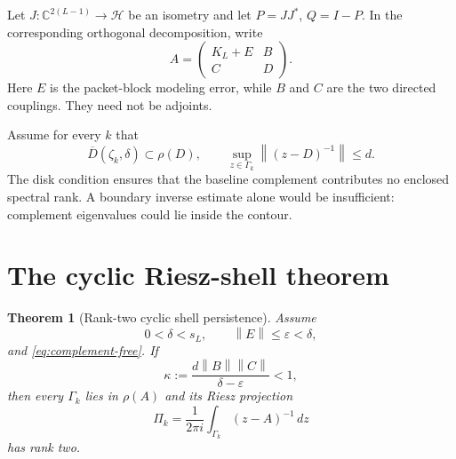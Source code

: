 \documentclass[12pt]{article}
\newtheorem{theorem}{Theorem}[section]
\theoremstyle{remark}
\newcommand{\cH}{\mathcal H}
\newcommand{\norm}[1]{\left\lVert#1\right\rVert}
\begin{document}
Let $J:\mathbb C^{2(L-1)}\to\cH$ be an isometry and let $P=JJ^*$,
$Q=I-P$.  In the corresponding orthogonal decomposition, write
\begin{equation}\label{eq:block}
 A=\begin{pmatrix}
 K_L+E&B\\
 C&D
 \end{pmatrix}.
\end{equation}
Here $E$ is the packet-block modeling error, while $B$ and $C$ are the two
directed couplings.  They need not be adjoints.

Assume for every $k$ that
\begin{equation}\label{eq:complement-free}
 \overline D(\zeta_k,\delta)\subset\rho(D),
 \qquad
 \sup_{z\in\Gamma_k}\norm{(z-D)^{-1}}\le d.
\end{equation}
The disk condition ensures that the baseline complement contributes no
enclosed spectral rank.  A boundary inverse estimate alone would be
insufficient: complement eigenvalues could lie inside the contour.

\section{The cyclic Riesz-shell theorem}

\begin{theorem}[Rank-two cyclic shell persistence]\label{thm:riesz}
Assume
\begin{equation}\label{eq:geometry-assumptions}
 0<\delta<s_L,
 \qquad
 \norm E\le\varepsilon<\delta,
\end{equation}
and \eqref{eq:complement-free}.  If
\begin{equation}\label{eq:schur}
 \kappa:=\frac{d\norm B\norm C}{\delta-\varepsilon}<1,
\end{equation}
then every $\Gamma_k$ lies in $\rho(A)$ and its Riesz projection
\begin{equation}\label{eq:riesz-projection}
 \Pi_k=\frac1{2\pi i}\int_{\Gamma_k}(z-A)^{-1}\,dz
\end{equation}
has rank two.
\end{theorem}
\end{document}
